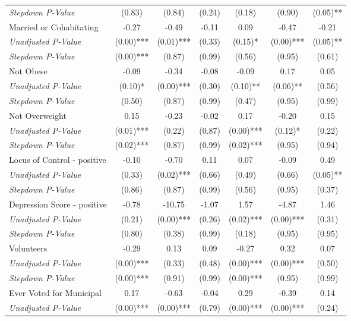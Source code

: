 \begin{tabular}{l c c c c c c}
\quad \textit{Stepdown P-Value} & (0.83) & (0.84) & (0.24) & (0.18) & (0.90) & (0.05)** \\
Married or Cohabitating & -0.27 & -0.49 & -0.11 & 0.09 & -0.47 & -0.21 \\
\quad \textit{Unadjusted P-Value} & (0.00)*** & (0.01)*** & (0.33) & (0.15)* & (0.00)*** & (0.05)** \\
\quad \textit{Stepdown P-Value} & (0.00)*** & (0.87) & (0.99) & (0.56) & (0.95) & (0.61) \\
Not Obese & -0.09 & -0.34 & -0.08 & -0.09 & 0.17 & 0.05 \\
\quad \textit{Unadjusted P-Value} & (0.10)* & (0.00)*** & (0.30) & (0.10)** & (0.06)** & (0.56) \\
\quad \textit{Stepdown P-Value} & (0.50) & (0.87) & (0.99) & (0.47) & (0.95) & (0.99) \\
Not Overweight & 0.15 & -0.23 & -0.02 & 0.17 & -0.20 & 0.15 \\
\quad \textit{Unadjusted P-Value} & (0.01)*** & (0.22) & (0.87) & (0.00)*** & (0.12)* & (0.22) \\
\quad \textit{Stepdown P-Value} & (0.02)*** & (0.87) & (0.99) & (0.02)*** & (0.95) & (0.94) \\
Locus of Control - positive & -0.10 & -0.70 & 0.11 & 0.07 & -0.09 & 0.49 \\
\quad \textit{Unadjusted P-Value} & (0.33) & (0.02)*** & (0.66) & (0.49) & (0.66) & (0.05)** \\
\quad \textit{Stepdown P-Value} & (0.86) & (0.87) & (0.99) & (0.56) & (0.95) & (0.37) \\
Depression Score - positive & -0.78 & -10.75 & -1.07 & 1.57 & -4.87 & 1.46 \\
\quad \textit{Unadjusted P-Value} & (0.21) & (0.00)*** & (0.26) & (0.02)*** & (0.00)*** & (0.31) \\
\quad \textit{Stepdown P-Value} & (0.80) & (0.38) & (0.99) & (0.18) & (0.95) & (0.95) \\
Volunteers & -0.29 & 0.13 & 0.09 & -0.27 & 0.32 & 0.07 \\
\quad \textit{Unadjusted P-Value} & (0.00)*** & (0.33) & (0.48) & (0.00)*** & (0.00)*** & (0.50) \\
\quad \textit{Stepdown P-Value} & (0.00)*** & (0.91) & (0.99) & (0.00)*** & (0.95) & (0.99) \\
Ever Voted for Municipal & 0.17 & -0.63 & -0.04 & 0.29 & -0.39 & 0.14 \\
\quad \textit{Unadjusted P-Value} & (0.00)*** & (0.00)*** & (0.79) & (0.00)*** & (0.00)*** & (0.24) \\

\end{tabular}
